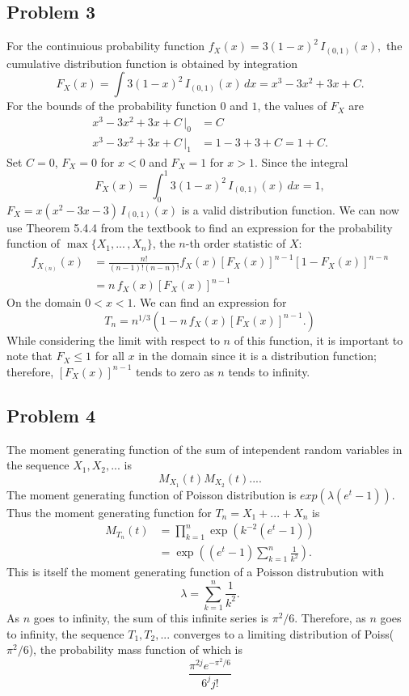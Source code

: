 \documentclass{article}
\begin{document}
\subsection*{Problem 3}
For the continuious probability function $f_X(x) = 3(1-x)^2\,I_{(0,1)}(x),$ the cumulative distribution function is obtained by integration \[F_X(x) = \int 3(1-x)^2\,I_{(0,1)}(x)\,dx = x^3 -3x^2 +3x + C.\] For the bounds of the probability function $0$ and $1$, the values of $F_X$ are 
\[\begin{aligned}
x^3 -3x^2 +3x + C\,\big|_0 &= C \\
x^3 -3x^2 +3x + C\,\big|_1 &= 1-3+3+C = 1+C.
\end{aligned}\]
Set $C = 0$, $F_X = 0$ for $x < 0$ and $F_X = 1$ for $x > 1$. Since the integral \[F_X(x) =  \int_0^1 3(1-x)^2\,I_{(0,1)}(x)\,dx = 1,\] $F_X = x(x^2-3x-3)\,I_{(0,1)}(x)$ is a valid distribution function. We can now use Theorem 5.4.4 from the textbook to find an expression for the probability function of $\max\{X_1, ...\,, X_n\}$, the $n$-th order statistic of $X$:
\[\begin{aligned}
f_{X_{(n)}}(x) &= \frac{n!}{(n-1)!(n-n)!}f_X(x)\left[F_X(x)\right]^{n-1}\left[1-F_X(x)\right]^{n-n} \\
&= n\,f_X(x)\left[F_X(x)\right]^{n-1}
\end{aligned}\]
On the domain $0<x<1$. We can find an expression for \[T_n = n^{1/3}\left(1-n\,f_X(x)\left[F_X(x)\right]^{n-1}.\right)\] While considering the limit with respect to $n$ of this function, it is important to note that $F_X \leq 1$ for all $x$ in the domain since it is a distribution function; therefore, $\left[F_X(x)\right]^{n-1}$ tends to zero as $n$ tends to infinity.

\subsection*{Problem 4}
The moment generating function of the sum of intependent random variables in the sequence $X_1, X_2, ...$ is 
\[M_{X_1}(t)M_{X_2}(t)... .\]
The moment generating function of Poisson distribution is $exp(\lambda(e^t-1))$. Thus the moment generating function for $T_n = X_1 + ... + X_n$ is
\[\begin{aligned}M_{T_n}(t) &= \prod_{k=1}^{n} \exp\left(k^{-2}\left(e^t - 1\right)\right) \\
&= \exp\left(\left(e^t-1\right)\sum_{k=1}^{n} \frac{1}{k^2}\right).\end{aligned}\] 
This is itself the moment generating function of a Poisson distrubution with \[\lambda = \sum_{k=1}^{n} \frac{1}{k^2}.\]
As $n$ goes to infinity, the sum of this infinite series is $\pi^2/6$. Therefore, as $n$ goes to infinity, the sequence $T_1, T_2, ...$ converges to a limiting distribution of Poiss($\pi^2/6$), the probability mass function of which is 
\[\frac{\pi^{2j} e^{-\pi^2/6}}{6^j j!}\]
\end{document}
